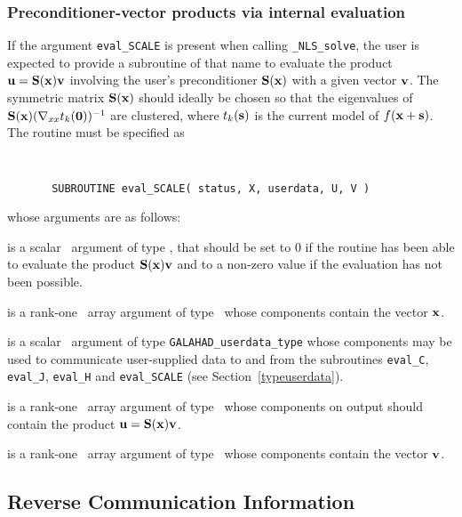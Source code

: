 \documentclass{galahad}
\newcommand{\packagename}{NLS}
\newcommand{\fullpackagename}{\libraryname\_\packagename}
\newcommand{\solver}{{\tt \fullpackagename\_solve}}
\begin{document}

\subsubsection{Preconditioner-vector products via internal evaluation\label{pv}}

If the argument {\tt eval\_SCALE} is present when calling \solver, the
user is expected to provide a subroutine of that name to evaluate the
product ${\mathbf{u}} = {\mathbf{S}}({\mathbf{x}}) {\mathbf{v}}$ involving the user's preconditioner
${\mathbf{S}}({\mathbf{x}})$ with a given vector ${\mathbf{v}}$. The symmetric matrix ${\mathbf{S}}({\mathbf{x}})$
should ideally be chosen so that the eigenvalues of
${\mathbf{S}}({\mathbf{x}}) (\nabla_{xx} t_k({\mathbf{0}}))^{-1}$ are clustered, where $t_k({\mathbf{s}})$
is the current model of $f({\mathbf{x}}+{\mathbf{s}})$.
The routine must be specified as

\def\baselinestretch{0.8}
{\tt
\begin{verbatim}
       SUBROUTINE eval_SCALE( status, X, userdata, U, V )
\end{verbatim} }
\def\baselinestretch{1.0}
\noindent whose arguments are as follows:

\begin{description}
 is a scalar \intentout\ argument of type \integer,
that should be set to 0 if the routine has been able to evaluate the
product ${\mathbf{S}}({\mathbf{x}}) {\mathbf{v}}$
and to a non-zero value if the evaluation has not been possible.

 is a rank-one \intentin\ array argument of type \realdp\
whose components contain the vector ${\mathbf{x}}$.

 is a scalar \intentinout\ argument of type
{\tt GALAHAD\_userdata\_type} whose components may be used
to communicate user-supplied data to and from the
subroutines {\tt eval\_C}, {\tt eval\_J},
{\tt eval\_H} and {\tt eval\_SCALE}
(see Section~\ref{typeuserdata}).

 is a rank-one \intentout\ array argument of type \realdp\
whose components on output should contain the product ${\mathbf{u}} = {\mathbf{S}}({\mathbf{x}}) {\mathbf{v}}$.

\ittf{V} is a rank-one \intentin\ array argument of type \realdp\
whose components contain the vector ${\mathbf{v}}$.

\end{description}


\subsection{\label{reverse}Reverse Communication Information}
\end{document}
